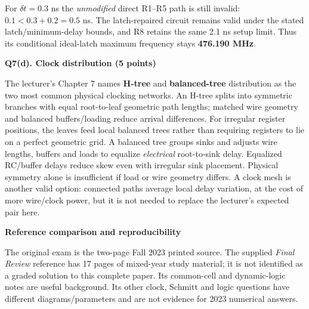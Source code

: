 \documentclass[10pt]{article}
\newcommand{\qheading}[1]{\par\medskip\textbf{#1}\par}
\begin{document}
For $\delta t=0.3$ ns the \emph{unmodified} direct R1--R5 path is still invalid: $0.1<0.3+0.2=0.5$ ns. The latch-repaired circuit remains valid under the stated latch/minimum-delay bounds, and R8 retains the same 2.1 ns setup limit. Thus its conditional ideal-latch maximum frequency stays \textbf{476.190 MHz}.
\newpage
\qheading{Q7(d). Clock distribution (5 points)}
The lecturer's Chapter 7 names \textbf{H-tree} and \textbf{balanced-tree} distribution as the two most common physical clocking networks.
An H-tree splits into symmetric branches with equal root-to-leaf geometric path lengths; matched wire geometry and balanced buffers/loading reduce arrival differences. For irregular register positions, the leaves feed local balanced trees rather than requiring registers to lie on a perfect geometric grid.
A balanced tree groups sinks and adjusts wire lengths, buffers and loads to equalize \emph{electrical} root-to-sink delay. Equalized RC/buffer delays reduce skew even with irregular sink placement. Physical symmetry alone is insufficient if load or wire geometry differs. A clock mesh is another valid option: connected paths average local delay variation, at the cost of more wire/clock power, but it is not needed to replace the lecturer's expected pair here.
\begin{center}\end{center}
\qheading{Reference comparison and reproducibility}
The original exam is the two-page Fall 2023 printed source. The supplied \emph{Final Review} reference has 17 pages of mixed-year study material; it is not identified as a graded solution to this complete paper. Its common-cell and dynamic-logic notes are useful background. Its other clock, Schmitt and logic questions have different diagrams/parameters and are not evidence for 2023 numerical answers.
\end{document}
